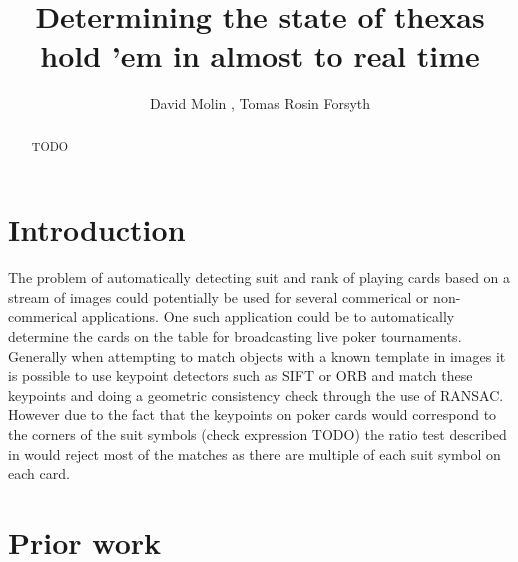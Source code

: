 \documentclass[journal,twoside]{IEEEtran}
\begin{document}
\title{Determining the state of thexas hold 'em in almost to real time}

\author{ David Molin 
, 
Tomas Rosin Forsyth 

}%

\maketitle

\begin{abstract}
TODO

\end{abstract}




\IEEEpeerreviewmaketitle



\section{Introduction}
The problem of automatically detecting suit and rank of playing cards based on a stream of images could potentially be used for  several commerical or non-commerical applications. One such application could be to automatically determine the cards on the table for broadcasting live poker tournaments.
Generally when attempting to match objects with a known template in images it is possible to use keypoint detectors such as SIFT \cite{SIFT} or ORB \cite{ORB} and match these keypoints and doing a geometric consistency check through the use of RANSAC. However due to the fact that the keypoints on poker cards would correspond to the corners of the suit symbols (check expression TODO) the ratio test described in \cite{SIFT} would reject most of the matches as there are multiple of each suit symbol on each card.


\section{Prior work}
\end{document}
